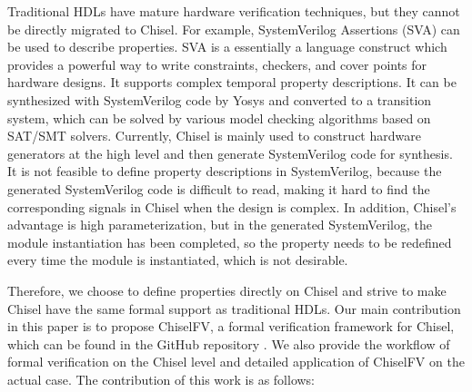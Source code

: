 \documentclass[conference]{IEEEtran}
\theoremstyle{definition}
\begin{document}
Traditional HDLs have mature hardware verification techniques, but they cannot be directly migrated to Chisel.
For example, SystemVerilog Assertions (SVA) \cite{vijayaraghavan2005practical} can be used to describe properties. SVA is a essentially a language construct which provides a powerful way to write constraints, checkers, and cover points for hardware designs. It supports complex temporal property descriptions. It can be synthesized with SystemVerilog code by Yosys \cite{wolf2016yosys} and converted to a transition system, which can be solved by various model checking algorithms based on SAT/SMT solvers.
Currently, Chisel is mainly used to construct hardware generators at the high level and then generate SystemVerilog code for synthesis. It is not feasible to define property descriptions in SystemVerilog, because the generated SystemVerilog code is difficult to read, making it hard to find the corresponding signals in Chisel when the design is complex. In addition, Chisel's advantage is high parameterization, but in the generated SystemVerilog, the module instantiation has been completed, so the property needs to be redefined every time the module is instantiated, which is not desirable.

Therefore, we choose to define properties directly on Chisel and strive to make Chisel have the same formal support as traditional HDLs. 
Our main contribution in this paper is to propose ChiselFV, a formal verification framework for Chisel, which can be found in the GitHub repository \cite{ChiselFV}.
We also provide the workflow of formal verification on the Chisel level and detailed application of ChiselFV on the actual case. The contribution of this work is as follows:
\end{document}
